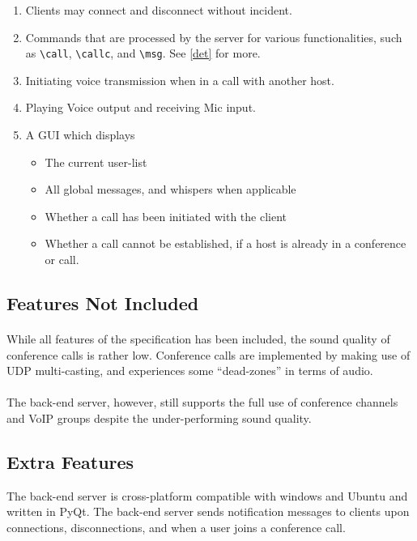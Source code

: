 \documentclass[10pt,a4paper]{article}
\begin{document}
\begin{enumerate}
 \item Clients may connect and disconnect without incident.
 \item Commands that are processed by the server for various functionalities, such as \verb|\call|, \verb|\callc|, and \verb|\msg|. See \ref{det} for more.
 \item Initiating voice transmission when in a call with another host.
 \item Playing Voice output and receiving Mic input.
 \item A GUI which displays
 \begin{itemize}
  \item The current user-list
  \item All global messages, and whispers when applicable
  \item Whether a call has been initiated with the client
  \item Whether a call cannot be established, if a host is already in a conference or call.
 \end{itemize}

\end{enumerate}

\subsection{Features Not Included}
\paragraph{}
While all features of the specification has been included, the sound quality of
conference calls is rather low. Conference calls are implemented by
making use of UDP multi-casting, and experiences some ``dead-zones'' in terms of
audio. 
\paragraph{}
The back-end server, however, still supports the full use of conference
channels and VoIP groups despite the under-performing sound quality.

\subsection{Extra Features}
The back-end server is cross-platform compatible with windows and Ubuntu and
written in PyQt. The back-end server sends notification messages to clients upon
connections, disconnections, and when a user joins a conference call.
\end{document}
